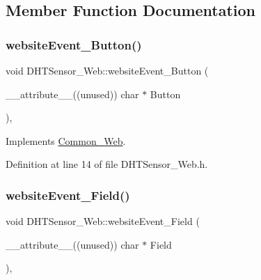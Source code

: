 \subsection{Member Function Documentation}
\mbox{\label{class_d_h_t_sensor___web_aad3323a4869c3cf99d7c5e257b487867}} 
\subsubsection{\texorpdfstring{website\+Event\+\_\+\+Button()}{websiteEvent\_Button()}}
{\footnotesize\ttfamily void D\+H\+T\+Sensor\+\_\+\+Web\+::website\+Event\+\_\+\+Button (\begin{DoxyParamCaption}\item[{\+\_\+\+\_\+attribute\+\_\+\+\_\+((unused)) char $\ast$}]{Button }\end{DoxyParamCaption})\hspace{0.3cm}{\ttfamily [inline]}, {\ttfamily [virtual]}}



Implements \hyperlink{class_common___web_acd10f27b30f3111277b4730ee5495090}{Common\+\_\+\+Web}.



Definition at line 14 of file D\+H\+T\+Sensor\+\_\+\+Web.\+h.

\mbox{\label{class_d_h_t_sensor___web_a1bd32356da7d365f165a05475fcc1877}} 
\subsubsection{\texorpdfstring{website\+Event\+\_\+\+Field()}{websiteEvent\_Field()}}
{\footnotesize\ttfamily void D\+H\+T\+Sensor\+\_\+\+Web\+::website\+Event\+\_\+\+Field (\begin{DoxyParamCaption}\item[{\+\_\+\+\_\+attribute\+\_\+\+\_\+((unused)) char $\ast$}]{Field }\end{DoxyParamCaption})\hspace{0.3cm}{\ttfamily [inline]}, {\ttfamily [virtual]}}



